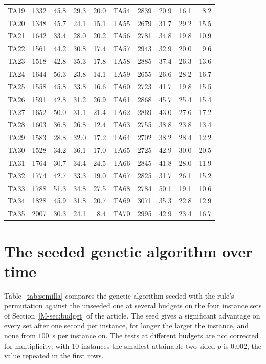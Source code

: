 \documentclass[11pt]{article}
\begin{document}
\begin{table}[!htb]
\begin{tabular}{lrrrr@{\hskip 0.9em}|@{\hskip 0.9em}lrrrr}
TA19 & 1332 & 45.8 & 29.3 & 20.0 & TA54 & 2839 & 20.9 & 16.1 & 8.2 \\
TA20 & 1348 & 45.7 & 24.1 & 15.1 & TA55 & 2679 & 31.7 & 29.2 & 15.5 \\
TA21 & 1642 & 33.4 & 28.0 & 20.2 & TA56 & 2781 & 34.8 & 19.8 & 10.9 \\
TA22 & 1561 & 44.2 & 30.8 & 17.4 & TA57 & 2943 & 32.9 & 20.0 & 9.6 \\
TA23 & 1518 & 42.8 & 35.3 & 17.8 & TA58 & 2885 & 37.4 & 26.3 & 13.6 \\
TA24 & 1644 & 56.3 & 23.8 & 14.1 & TA59 & 2655 & 26.6 & 28.2 & 16.7 \\
TA25 & 1558 & 45.8 & 33.8 & 16.6 & TA60 & 2723 & 41.7 & 19.8 & 15.5 \\
TA26 & 1591 & 42.8 & 31.2 & 26.9 & TA61 & 2868 & 45.7 & 25.4 & 15.4 \\
TA27 & 1652 & 50.0 & 31.1 & 21.4 & TA62 & 2869 & 43.0 & 27.6 & 17.2 \\
TA28 & 1603 & 36.8 & 26.8 & 12.4 & TA63 & 2755 & 38.8 & 23.8 & 13.4 \\
TA29 & 1583 & 28.8 & 32.0 & 17.2 & TA64 & 2702 & 38.2 & 28.4 & 12.2 \\
TA30 & 1528 & 34.2 & 36.1 & 17.0 & TA65 & 2725 & 42.9 & 30.0 & 20.5 \\
TA31 & 1764 & 30.7 & 34.4 & 24.5 & TA66 & 2845 & 41.8 & 28.0 & 11.9 \\
TA32 & 1774 & 42.7 & 33.3 & 19.0 & TA67 & 2825 & 31.7 & 26.1 & 15.2 \\
TA33 & 1788 & 51.3 & 34.8 & 27.5 & TA68 & 2784 & 50.1 & 19.1 & 10.6 \\
TA34 & 1828 & 45.9 & 31.8 & 20.7 & TA69 & 3071 & 35.3 & 22.8 & 12.9 \\
TA35 & 2007 & 30.3 & 24.1 & 8.4 & TA70 & 2995 & 42.9 & 23.4 & 16.7 \\
\bottomrule
\end{tabular}
\end{table}

\section{The seeded genetic algorithm over time}
\label{sec:semilla}

Table~\ref{tab:semilla} compares the genetic algorithm seeded with the
rule's permutation against the unseeded one at several budgets on the
four instance sets of Section~\ref{M-sec:budget} of the article. The
seed gives a significant advantage on every set after one second per
instance, for longer the larger the instance, and none from $100$~s per
instance on. The tests at different budgets are not corrected for
multiplicity; with 10 instances the smallest attainable two-sided $p$ is
$0.002$, the value repeated in the first rows.
\end{document}

